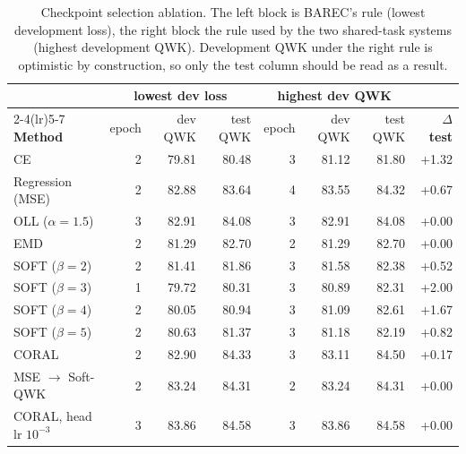 \begin{table}[H]
\centering
\footnotesize
\caption{Checkpoint selection ablation. The left block is BAREC's rule (lowest development loss), the right block the rule used by the two shared-task systems (highest development QWK). Development QWK under the right rule is optimistic by construction, so only the test column should be read as a result.}
\label{tab:res-selection}
\begin{tabular}{lrrrrrrr}
\toprule
& \multicolumn{3}{c}{\textbf{lowest dev loss}} & \multicolumn{3}{c}{\textbf{highest dev QWK}} & \\
\cmidrule(lr){2-4}\cmidrule(lr){5-7}
\textbf{Method} & epoch & dev QWK & test QWK & epoch & dev QWK & test QWK & \textbf{$\Delta$ test} \\
\midrule
CE & 2 & 79.81 & 80.48 & 3 & 81.12 & 81.80 & +1.32 \\
Regression (MSE) & 2 & 82.88 & 83.64 & 4 & 83.55 & 84.32 & +0.67 \\
OLL ($\alpha=1.5$) & 3 & 82.91 & 84.08 & 3 & 82.91 & 84.08 & +0.00 \\
EMD & 2 & 81.29 & 82.70 & 2 & 81.29 & 82.70 & +0.00 \\
SOFT ($\beta=2$) & 2 & 81.41 & 81.86 & 3 & 81.58 & 82.38 & +0.52 \\
SOFT ($\beta=3$) & 1 & 79.72 & 80.31 & 3 & 80.89 & 82.31 & +2.00 \\
SOFT ($\beta=4$) & 2 & 80.05 & 80.94 & 3 & 81.09 & 82.61 & +1.67 \\
SOFT ($\beta=5$) & 2 & 80.63 & 81.37 & 3 & 81.18 & 82.19 & +0.82 \\
CORAL & 2 & 82.90 & 84.33 & 3 & 83.11 & 84.50 & +0.17 \\
MSE $\rightarrow$ Soft-QWK & 2 & 83.24 & 84.31 & 2 & 83.24 & 84.31 & +0.00 \\
CORAL, head lr $10^{-3}$ & 3 & 83.86 & 84.58 & 3 & 83.86 & 84.58 & +0.00 \\
\bottomrule
\end{tabular}
\end{table}
